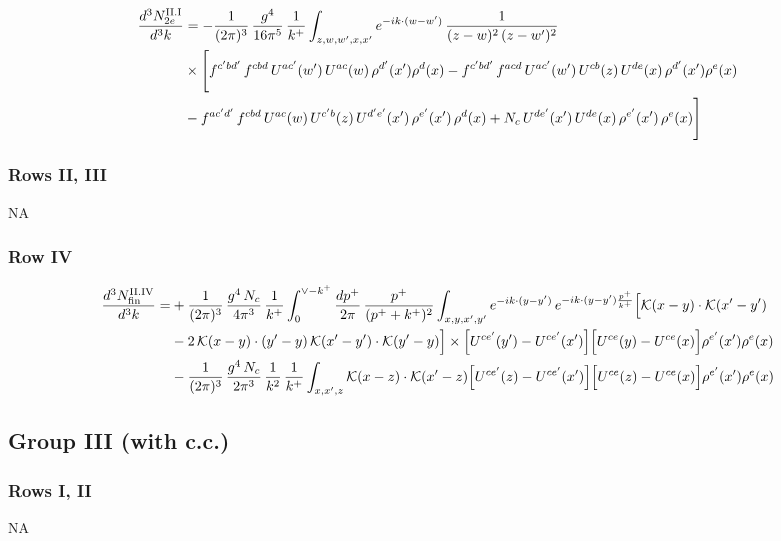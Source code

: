 \documentclass[9pt]{article}
\numberwithin{equation}{section}
\begin{document}
\begin{align}
\frac{d^{3}N^{\rm II.I}_{2e}}{d^{3}k}&= -\frac{1}{(2\pi)^{3}}\,\frac{g^{4}}{16\pi^{5}}\,\frac{1}{k^{+}}\int_{z,w,w^{\prime},x,x^{\prime}}e^{-ik\cdot(w-w^{\prime})}\,\frac{1}{(z-w)^{2}\,(z-w^{\prime})^{2}}\notag\\
&\times\Bigg[f^{c^{\prime}bd^{\prime}}\,f^{cbd}\, U^{ac^{\prime}}(w^{\prime})\,U^{ac}(w)\,\rho^{d^{\prime}}(x^{\prime})\rho^{d}(x)- f^{c^{\prime}bd^{\prime}}\,f^{acd}\,U^{ac^{\prime}}(w^{\prime})\,U^{cb}(z)\,U^{de}(x)\,\rho^{d^{\prime}}(x^{\prime})\rho^{e}(x) \notag \\ & -f^{ac^{\prime}d^{\prime}}\,f^{cbd}\,U^{ac}(w)\,U^{c^{\prime}b}(z)\,U^{d^{\prime}e^{\prime}}(x^{\prime})\,\rho^{e^{\prime}}(x^{\prime})\,\rho^{d}(x) +N_{c}\,U^{de^{\prime}}(x^{\prime})\,U^{de}(x)\,\rho^{e^{\prime}}(x^{\prime})\,\rho^{e}(x)\Bigg]\label{eq:B-II2e}
\end{align}
\subsubsection*{Rows II, III} \textsc{NA}
\subsubsection*{Row IV}
\begin{align}
\frac{d^{3}N^{\rm II.IV}_{\rm fin}}{d^{3}k}= &  +\frac{1}{(2\pi)^{3}}\,\frac{g^{4}\,N_{c}}{4\pi^{3}}\,\frac{1}{k^{+}}\int_{0}^{\vee-k^{+}}\frac{dp^{+}}{2\pi}\,\frac{p^{+}}{(p^{+}+k^{+})^{2}}\int_{x,y,x',y'}e^{-ik\cdot(y-y')}\,e^{-ik\cdot(y-y')\frac{p^{+}}{k^{+}}}\Big[\mathcal{K}(x-y)\cdot\mathcal{K}(x'-y')\notag \\ & -2\,\mathcal{K}(x-y)\cdot(y'-y)\,\mathcal{K}(x'-y')\cdot\mathcal{K}(y'-y)\Big]\times\Big[U^{ce'}(y') - U^{ce'}(x')\Big]\Big[U^{ce}(y) - U^{ce}(x)\Big]\rho^{e'}(x')\rho^{e}(x)\notag \\ & -\frac{1}{(2\pi)^{3}}\,\frac{g^{4}\,N_{c}}{2\pi^{3}}\,\frac{1}{k^{2}}\,\frac{1}{k^{+}}\int_{x,x',z}\mathcal{K}(x-z)\cdot\mathcal{K}(x'-z)\Big[U^{ce'}(z)-U^{ce'}(x')\Big]\Big[U^{ce}(z)-U^{ce}(x)\Big]\rho^{e'}(x')\rho^{e}(x)\label{eq:B-II4rem}
\end{align}
\subsection{Group III (with c.c.)}
\subsubsection*{Rows I, II} \textsc{NA}
\end{document}
